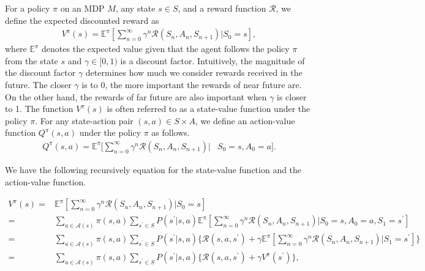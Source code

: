 \begin{definition}
  For a policy $\pi$ on an MDP $M$, any state $s \in S$, and a reward function $\mathcal{R}$, we define the expected discounted reward as
  \begin{align*}
    V^{\pi}(s)= \mathbb{E}^{\pi}[\sum_{n=0}^{\infty}\gamma^n \mathcal{R}(S_n, A_n, S_{n+1})|S_0 = s],
  \end{align*}
where $\mathbb{E}^{\pi}$ denotes the expected value given that the agent follows the policy $\pi$ from the state $s$ and $\gamma \in [0,1)$ is a discount factor. Intuitively, the magnitude of the discount factor $\gamma$ determines how much we consider rewards received in the future. The closer $\gamma$ is to 0, the more important the rewards of near future are. On the other hand, the rewards of far future are also important when $\gamma$ is closer to 1. The function $V^{\pi}(s)$ is often referred to as a state-value function under the policy $\pi$. For any state-action pair $(s,a) \in S \times A$, we define an action-value function $Q^{\pi}(s,a)$ under the policy $\pi$ as follows.
  \begin{align*}
    Q^{\pi}(s,a)= \mathbb{E}^{\pi}[\sum_{n=0}^{\infty}\gamma^n \mathcal{R}(S_n, A_n, S_{n+1})|&S_0 = s, A_0 = a].
  \end{align*}

  We have the following recursively equation for the state-value function and the action-value function.

  \begin{align}
    V^{\pi}(s) = & \mathbb{E}^{\pi}[\sum_{n=0}^{\infty}\gamma^n \mathcal{R}(S_n, A_n, S_{n+1})|S_0 = s] \nonumber \\
     = & \sum_{a \in \mathcal{A}(s)} \pi(s,a) \sum_{s^{\prime} \in S} P(s^{\prime}|s,a) \mathbb{E}^{\pi}[\sum_{n=0}^{\infty}\gamma^n \mathcal{R}(S_n, A_n, S_{n+1})|S_0 = s, A_0 = a, S_1 = s^{\prime}] \nonumber \\
     = & \sum_{a \in \mathcal{A}(s)} \pi(s,a) \sum_{s^{\prime} \in S} P(s^{\prime}|s,a) \{ \mathcal{R}(s, a, s^{\prime}) + \gamma \mathbb{E}^{\pi}[\sum_{n=0}^{\infty}\gamma^n \mathcal{R}(S_n, A_n, S_{n+1})|S_1 = s^{\prime}] \} \nonumber \\
    = & \sum_{a \in \mathcal{A}(s)} \pi(s,a) \sum_{s^{\prime} \in S} P(s^{\prime}|s,a) \{ \mathcal{R}(s, a, s^{\prime}) + \gamma V^{\pi}(s^{\prime}) \},
    \label{V_pi}
  \end{align}
\end{definition}

